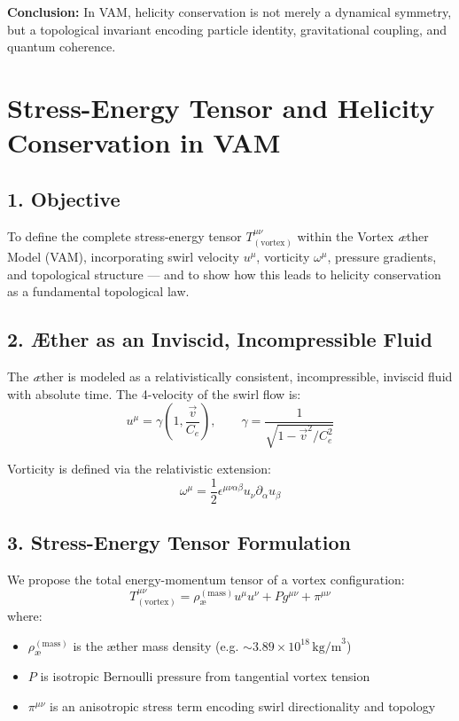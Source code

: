 \documentclass[twocolumn,aps,pre,floatfix,nofootinbib]{revtex4-2}
\begin{document}
    \textbf{Conclusion:} In VAM, helicity conservation is not merely a dynamical symmetry, but a topological invariant encoding particle identity, gravitational coupling, and quantum coherence.


    \section{Stress-Energy Tensor and Helicity Conservation in VAM}

    \subsection*{1. Objective}

    To define the complete stress-energy tensor \( T^{\mu\nu}_{(\text{vortex})} \) within the Vortex \textit{\ae}ther Model (VAM), incorporating swirl velocity \( u^\mu \), vorticity \( \omega^\mu \), pressure gradients, and topological structure — and to show how this leads to helicity conservation as a fundamental topological law.

    \subsection*{2. Æther as an Inviscid, Incompressible Fluid}

    The \textit{\ae}ther is modeled as a relativistically consistent, incompressible, inviscid fluid with absolute time. The 4-velocity of the swirl flow is:
    \begin{equation}
        u^\mu = \gamma \left(1, \frac{\vec{v}}{C_e}\right), \qquad \gamma = \frac{1}{\sqrt{1 - \vec{v}^2 / C_e^2}}
    \end{equation}

    Vorticity is defined via the relativistic extension:
    \begin{equation}
        \omega^\mu = \frac{1}{2} \epsilon^{\mu\nu\alpha\beta} u_\nu \partial_\alpha u_\beta
    \end{equation}

    \subsection*{3. Stress-Energy Tensor Formulation}

    We propose the total energy-momentum tensor of a vortex configuration:
    \begin{equation}
        T^{\mu\nu}_{(\text{vortex})} = \rho_{\text{\ae}}^{(\text{mass})} u^\mu u^\nu + P g^{\mu\nu} + \pi^{\mu\nu}
    \end{equation}
    where:
    \begin{itemize}
        \item \( \rho_{\text{\ae}}^{(\text{mass})} \) is the æther mass density (e.g. \( \sim 3.89 \times 10^{18} \,\text{kg/m}^3 \))
        \item \( P \) is isotropic Bernoulli pressure from tangential vortex tension
        \item \( \pi^{\mu\nu} \) is an anisotropic stress term encoding swirl directionality and topology
    \end{itemize}
\end{document}
